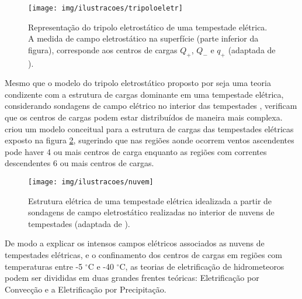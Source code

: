 \begin{figure}[ht]
\centering 
\texttt{[image: img/ilustracoes/tripoloeletr]}
\caption{Representação do tripolo eletrostático de uma tempestade elétrica. A medida de campo eletrostático na superfície (parte inferior da figura), corresponde aos centros de cargas $Q_{+}$, $Q_{-}$ e $q_{+}$ (adaptada de ).}
\label{fig:tripeletr}
\end{figure}

Mesmo que o modelo do tripolo eletrostático proposto por  seja uma teoria condizente com a estrutura de cargas dominante em uma tempestade elétrica, considerando sondagens de campo elétrico no interior das tempestades , verificam que os centros de cargas podem estar distribuídos de maneira mais complexa. 
 criou um modelo conceitual para a estrutura de cargas das tempestades elétricas exposto na figura \ref{fig:multipcentros}, sugerindo que nas regiões aonde ocorrem ventos ascendentes pode haver 4 ou mais centros de carga enquanto as regiões com correntes descendentes 6 ou mais centros de cargas.


\begin{figure}[ht]
\centering 
\texttt{[image: img/ilustracoes/nuvem]}
\caption{Estrutura elétrica de uma tempestade elétrica idealizada a partir de sondagens de campo eletrostático realizadas no interior de nuvens de tempestades (adaptada de ).}
\label{fig:multipcentros}
\end{figure}


De modo a explicar os intensos campos elétricos associados as nuvens de tempestades elétricas, e o confinamento dos centros de cargas em regiões com temperaturas entre -5 $^{\circ}$C e -40 $^{\circ}$C, as teorias de eletrificação de hidrometeoros podem ser divididas em duas grandes frentes teóricas: Eletrificação por Convecção e a Eletrificação por Precipitação.



